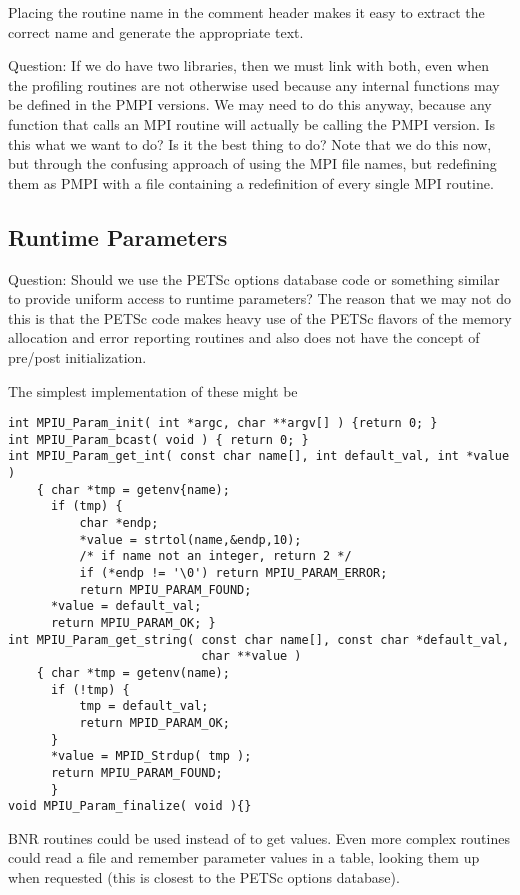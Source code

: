 \documentclass{article}
\begin{document}
Placing the routine name in the comment header makes it easy to
extract the correct name and generate the appropriate text.

Question: If we do have two libraries, then we must link with both,
even when the profiling routines are not otherwise used because any
internal functions may be defined in the PMPI versions.  We may need
to do this anyway, because any function that calls an MPI routine will
actually be calling the PMPI version.  Is this what we want to do?  Is
it the best thing to do?  Note that we do this now, but through the
confusing approach of using the MPI file names, but redefining them as PMPI
with a file containing a redefinition of every single MPI routine.

\subsection{Runtime Parameters}
Question: Should we use the PETSc options database code or something similar
to provide uniform access to runtime parameters?  
The reason that we may not do this is that the PETSc code makes heavy use of
the PETSc flavors of the memory allocation and error reporting routines and
also does not have the concept of pre/post initialization.

The simplest implementation of these might be
\begin{verbatim}
int MPIU_Param_init( int *argc, char **argv[] ) {return 0; }
int MPIU_Param_bcast( void ) { return 0; }
int MPIU_Param_get_int( const char name[], int default_val, int *value ) 
    { char *tmp = getenv{name); 
      if (tmp) { 
          char *endp;
          *value = strtol(name,&endp,10); 
          /* if name not an integer, return 2 */
          if (*endp != '\0') return MPIU_PARAM_ERROR;
          return MPIU_PARAM_FOUND;
      *value = default_val; 
      return MPIU_PARAM_OK; }
int MPIU_Param_get_string( const char name[], const char *default_val,
                           char **value ) 
    { char *tmp = getenv(name); 
      if (!tmp) {
          tmp = default_val; 
          return MPID_PARAM_OK;
      }
      *value = MPID_Strdup( tmp );
      return MPIU_PARAM_FOUND;
      }
void MPIU_Param_finalize( void ){}
\end{verbatim}
BNR routines could be
used instead of  to get values.  Even more complex
routines could read a  file and remember parameter
values in a table, looking them up when requested (this is closest to
the PETSc options database).
\end{document}

